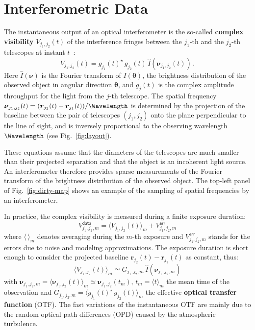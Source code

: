 \documentclass{article}
\newcommand{\vocab}[1]{\textbf{#1}}
\newcommand{\Tag}[1]{\mathsf{#1}}        %
\newcommand{\V}[1]{\boldsymbol{#1}}      %
\newcommand{\FT}[1]{\hat{#1}}            %
\newcommand{\Paren}[1]{\left(#1\right)}
\newcommand{\avg}[1]{\langle #1\rangle}
\newcommand{\Fig}[1]{Fig.~\ref{#1}}
\newcommand{\ComplexVis}{V}
\newcommand{\Freq}{\nu}               %
\newcommand{\VFreq}{\V{\Freq}}
\newcommand{\Dirn}{\theta}            %
\newcommand{\VDirn}{\V{\Dirn}}
\newcommand{\Posn}{r}                 %
\newcommand{\VPosn}{\V{\Posn}}
\newcommand{\Image}{I}
\newcommand{\Gain}{g}
\newcommand{\OTF}{G} %
\newcommand{\DataTag}{\Tag{data}}
\newcommand{\ErrorTag}{\Tag{err}}
\begin{document}
\section{Interferometric Data}
\label{sec:interferometric-data}

The instantaneous output of an optical interferometer is the so-called
\vocab{complex visibility} $\ComplexVis_{j_1,j_2}(t)$ of the interference
fringes between the $j_1$-th and the $j_2$-th telescopes at instant
$t$~\citep{Monnier-2003-interferometry}:
\begin{equation}
  \label{eq:instantaneous-complex-visibility}
  \ComplexVis_{j_1,j_2}(t) = \Gain_{j_1}(t)^{\star} \, \Gain_{j_2}(t) \,
  \FT{\Image}\Paren{\VFreq_{j_1,j_2}(t)} \, .
\end{equation}
Here $\FT{\Image}(\VFreq)$ is the Fourier transform of $\Image(\VDirn)$, the
brightness distribution of the observed object in angular direction $\VDirn$,
and $\Gain_{j}(t)$ is the complex amplitude throughput for the light from the
$j$-th telescope. The spatial frequency $\VFreq_{j_1,j_2}(t) =
(\VPosn_{j_2}(t) - \VPosn_{j_1}(t))/\Wavelength$ is determined by the
projection of the baseline between the pair of telescopes $(j_1,j_2)$ onto the
plane perpendicular to the line of sight, and is inversely proportional to the
observing wavelength $\Wavelength$ (see Fig.~\ref{fig:layout}).

These equations assume that the diameters of the telescopes are much smaller
than their projected separation and that the object is an incoherent light
source.  An interferometer therefore provides sparse measurements of the
Fourier transform of the brightness distribution of the observed object.  The
top-left panel of \Fig{fig:dirty-map} shows an example of the sampling of
spatial frequencies by an interferometer.

In practice, the complex visibility is measured during a finite exposure
duration:
\begin{equation}
  \label{eq:measured-complex-visibility}
  \ComplexVis_{j_1,j_2,m}^\DataTag = \avg{\ComplexVis_{j_1,j_2}(t)}_{m}
  + \ComplexVis_{j_1,j_2,m}^\ErrorTag
\end{equation}
where $\avg{\,}_{m}$ denotes averaging during the $m$-th exposure and
$\ComplexVis_{j_1,j_2,m}^\ErrorTag$ stands for the errors due to noise and
modeling approximations.  The exposure duration is short enough to consider
the projected baseline $\VPosn_{j_2}(t) - \VPosn_{j_1}(t)$ as constant, thus:
\begin{equation}
  \label{eq:averaged-complex-visibility}
  \avg{\ComplexVis_{j_1,j_2}(t)}_{m} \simeq
  \OTF_{j_1,j_2,m}\,
  \FT{\Image}\Paren{\VFreq_{j_1,j_2,m}}
\end{equation}
with $\VFreq_{j_1,j_2,m} = \avg{\VFreq_{j_1,j_2}(t)}_{m} \simeq
\VFreq_{j_1,j_2}(t_m)$, $t_m=\avg{t}_{m}$ the mean time of the observation and
$\OTF_{j_1,j_2,m} = \avg{\Gain_{j_1}(t)^{\star} \, \Gain_{j_2}(t)}_{m}$ the
effective \vocab{optical transfer function} (OTF). The fast variations of the
instantaneous OTF are mainly due to the random optical path differences (OPD)
caused by the atmospheric turbulence.
\end{document}
